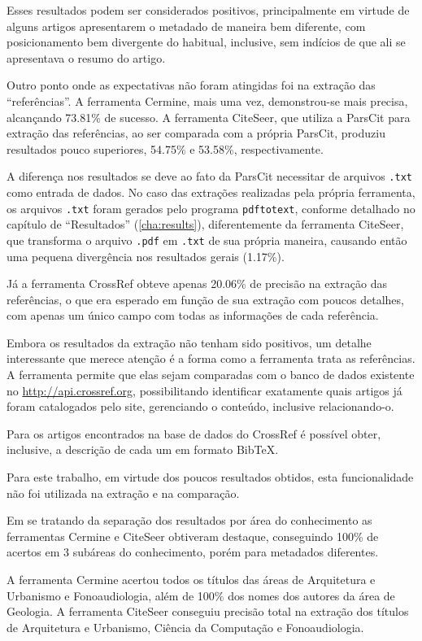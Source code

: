 Esses resultados podem ser considerados positivos, principalmente em virtude de alguns artigos apresentarem o metadado de maneira bem diferente, com posicionamento bem divergente do habitual, inclusive, sem indícios de que ali se apresentava o resumo do artigo.

Outro ponto onde as expectativas não foram atingidas foi na extração das ``referências''. A ferramenta Cermine, mais uma vez, demonstrou-se mais precisa, alcançando 73.81\% de sucesso. A ferramenta CiteSeer, que utiliza a ParsCit para extração das referências, ao ser comparada com a própria ParsCit, produziu resultados pouco superiores, 54.75\% e 53.58\%, respectivamente. 

A diferença nos resultados se deve ao fato da ParsCit necessitar de arquivos \texttt{.txt} como entrada de dados. No caso das extrações realizadas pela própria ferramenta, os arquivos \texttt{.txt} foram gerados pelo programa \texttt{pdftotext}, conforme detalhado no capítulo de ``Resultados'' (\autoref{cha:results}), diferentemente da ferramenta CiteSeer, que transforma o arquivo \texttt{.pdf} em \texttt{.txt} de sua própria maneira, causando então uma pequena divergência nos resultados gerais (1.17\%). 

Já a ferramenta CrossRef obteve apenas 20.06\% de precisão na extração das referências, o que era esperado em função de sua extração com poucos detalhes, com apenas um único campo com todas as informações de cada referência.

Embora os resultados da extração não tenham sido positivos, um detalhe interessante que merece atenção é a forma como a ferramenta trata as referências. A ferramenta permite que elas sejam comparadas com o banco de dados existente no \url{http://api.crossref.org}, possibilitando identificar exatamente quais artigos já foram catalogados pelo site, gerenciando o conteúdo, inclusive relacionando-o. 

Para os artigos encontrados na base de dados do CrossRef é possível obter, inclusive, a descrição de cada um em formato BibTeX.

Para este trabalho, em virtude dos poucos resultados obtidos, esta funcionalidade não foi utilizada na extração e na comparação.

Em se tratando da separação dos resultados por área do conhecimento as ferramentas Cermine e CiteSeer obtiveram destaque, conseguindo 100\% de acertos em 3 subáreas do conhecimento, porém para metadados diferentes.

A ferramenta Cermine acertou todos os títulos das áreas de Arquitetura e Urbanismo e Fonoaudiologia, além de 100\% dos nomes dos autores da área de Geologia. A ferramenta CiteSeer conseguiu precisão total na extração dos títulos de Arquitetura e Urbanismo, Ciência da Computação e Fonoaudiologia. 

